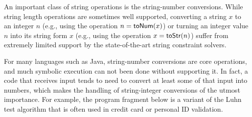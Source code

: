 \documentclass[sigplan,review,anonymous]{acmart}\settopmatter{printfolios=true,printccs=false,printacmref=false}
\begin{document}
An important class of string operations is  the string-number conversions.  While string length operations are sometimes well supported, converting a string $x$ to an integer $n$ (e.g., using the operation $n = \mbox{\textsf{toNum}($x$)}$) or turning an integer value $n$ into its string form $x$ (e.g., using the operation $x = \mbox{\textsf{toStr}($n$)}$)  suffer from extremely limited support by the state-of-the-art string constraint solvers. 

For many languages such as Java, string-number conversions are core operations, and much symbolic execution can not been done without supporting it. In fact,  a code that receives input tends to need to convert at least some of that input into numbers,  which makes the handling of string-integer conversions of the utmost importance. For example, the program fragment below is a variant of the Luhn test algorithm that is often used in credit card or personal ID validation.



%
%












\end{document}
